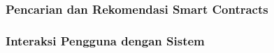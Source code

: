 \subsubsection{Pencarian dan Rekomendasi Smart Contracts}

\subsubsection{Interaksi Pengguna dengan Sistem}










